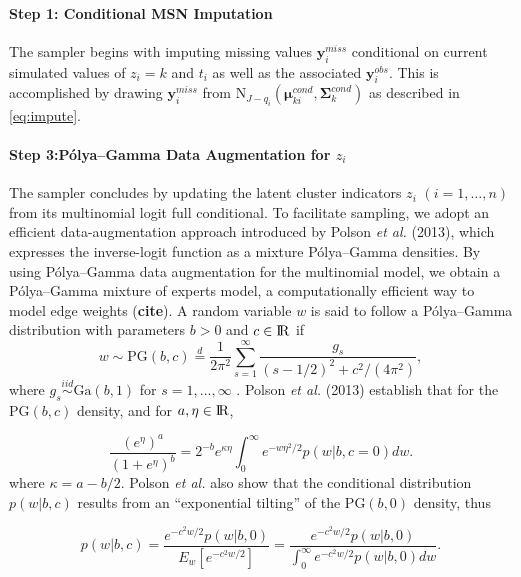 \documentclass[useAMS,referee]{biom}
\begin{document}
\paragraph{\textbf{Step 1}: Conditional MSN Imputation} The sampler begins with imputing missing values $\mathbf{y}_i^{miss}$ conditional on current simulated values of $z_i = k$ and $t_i$ as well as the associated $\mathbf{y}_i^{obs}$. This is accomplished by drawing $\mathbf{y}_i^{miss}$ from $\text{N}_{J-q_i}(\boldsymbol\mu^{cond}_{ki},\boldsymbol\Sigma^{cond}_k)$ as described in \ref{eq:impute}.

\paragraph{\textbf{Step 3:}P\'olya--Gamma Data Augmentation for $z_i$} The sampler concludes by updating the latent cluster indicators $z_i$ $(i=1,\ldots,n)$ from its multinomial logit full conditional. To facilitate sampling, we adopt an efficient data-augmentation approach introduced by Polson \textit{et al.} (2013), which expresses the inverse-logit function as a mixture P\'olya--Gamma densities. By using P\'olya--Gamma data augmentation for the multinomial model, we obtain a P\'olya--Gamma mixture of experts model, a computationally efficient way to model edge weights (\textbf{cite}). A random variable $w$ is said to follow a P\'olya--Gamma distribution with parameters $b > 0$ and $c \in {\rm I\!R}$ if
\begin{equation}
w \sim \text{PG}(b,c) \stackrel{d}{=} \frac{1}{2\pi^2}\sum_{s=1}^{\infty}\frac{g_s}{(s-1/2)^2 + c^2/(4\pi^2)}, \label{eq:pg1}
\end{equation}
where $g_s \stackrel{iid}{\sim} \text{Ga}(b,1)$ for $s = 1,...,\infty$ . Polson \textit{et al.} (2013) establish that for the $\text{PG}(b,c)$ density, and for $a,\eta \in {\rm I\!R}$, 

\begin{equation}
\frac{(e^{\eta})^a}{(1 + e^{\eta})^b} = 2^{-b}e^{\kappa \eta} \int_{0}^{\infty} e^{-w\eta^2/2}p(w|b,c = 0)dw. \label{eq:pg2}
\end{equation}
where $\kappa = a - b/2$. Polson \textit{et al.} also show that the conditional distribution $p(w|b,c)$ results from an ``exponential tilting'' of the $\text{PG}(b,0)$ density, thus

\begin{equation}
	p(w|b,c) = \frac{e^{-c^2w/2}p(w|b,0)}{E_w[e^{-c^2w/2}]} = \frac{e^{-c^2w/2}p(w|b,0)}{\int_0^\infty e^{-c^2w/2}p(w|b,0)dw}. \label{eq:pg3}
\end{equation}
\end{document}
